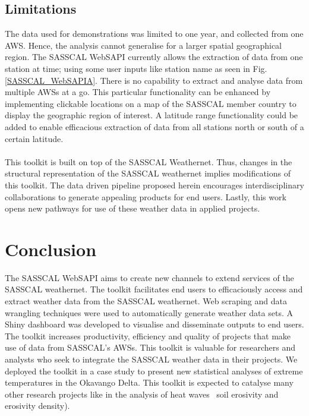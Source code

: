 \documentclass[a4paper, 10pt, conference]{ieeeconf}      %
\begin{document}
\subsection{Limitations}
\noindent
 The   data used for demonstrations  was limited to one year, and collected from one AWS. Hence, the analysis cannot generalise for a larger spatial geographical region. 
 The SASSCAL WebSAPI currently allows the extraction of data from one station at time; using some  user inputs like station name as seen in   Fig. \ref{SASSCAL_WebSAPIA}. 
 There is no capability to extract and analyse data from multiple AWSs at a go.
 This particular functionality can be enhanced by implementing clickable locations on a map of the SASSCAL member country to display the geographic region of interest.
A latitude range functionality could be added to enable efficacious extraction of data from all stations north or south of a certain latitude. 
\\
\\
This toolkit is built on top of the SASSCAL Weathernet. Thus, changes in the structural representation of the SASSCAL weathernet  implies modifications  of this toolkit.  
The  data driven pipeline proposed herein encourages interdisciplinary collaborations to generate appealing  products for end users.
  Lastly, this work opens new pathways for use of these weather data in applied projects. %

\noindent
\newpage
	\section{Conclusion}
	\label{Conclu}
	\noindent
The SASSCAL WebSAPI aims to   create new channels  to  extend  services of the SASSCAL weathernet.  The toolkit facilitates end users to efficaciously access  and extract  weather data from the  SASSCAL weathernet. 	  
	 	Web scraping and data wrangling techniques  were used to automatically generate weather data sets. A Shiny dashboard was developed to visualise and disseminate outputs to end users. 	 	The toolkit  increases productivity, efficiency and quality of  projects that make use of  data from SASSCAL's AWSs. 
	 	This  toolkit is  valuable  for researchers and analysts who seek to integrate the SASSCAL weather data in their   projects. 
	 	We deployed the toolkit  in a case study to present new statistical analyses of  extreme temperatures in the Okavango Delta.  
	 This toolkit is expected to catalyse many other research  projects like  in the analysis of heat waves \, soil erosivity and erosivity density). 
	 
\end{document}
